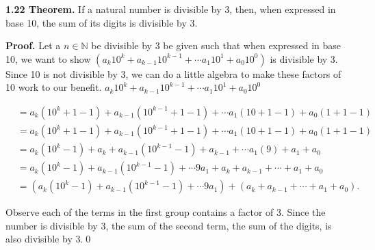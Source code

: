 \documentclass[12pt]{article}
\begin{document}
\noindent\textbf{1.22 Theorem.} If a natural number is divisible by 3, then, when expressed in base 10, the sum of its digits is divisible by 3.

\bigskip

\noindent\textbf{Proof.} Let a $n\in\mathbb{N}$ be divisible by 3 be given such that when expressed in base 10, we want to show $( a_k10^k + a_{k-1}10^{k-1} + \cdots a_1 10^1 + a_0 10^0 )$ is divisible by 3. Since 10 is not divisible by 3, we can do a little algebra to make these factors of 10 work to our benefit. $a_k10^k + a_{k-1}10^{k-1} + \cdots a_1 10^1 + a_0 10^0$

\begin{align*}
&= a_k(10^k +1 -1) + a_{k-1}(10^{k-1} +1 -1) + \cdots a_1(10+1-1) + a_0(1+1-1) \\
&= a_k(10^k +1 -1) + a_{k-1}(10^{k-1} +1 -1) + \cdots a_1(10+1-1) + a_0(1+1-1) \\
&= a_k(10^k -1)+ a_k + a_{k-1}(10^{k-1}-1)+a_{k-1} + \cdots a_1(9)+a_1 + a_0 \\
&= a_k(10^k -1) + a_{k-1}(10^{k-1}-1)+ \cdots 9a_1 +a_k +a_{k-1}+ \cdots +a_1 + a_0 \\
&= ( a_k(10^k -1) + a_{k-1}(10^{k-1}-1)+ \cdots 9a_1 ) + ( a_k +a_{k-1}+ \cdots +a_1 + a_0 ).
\end{align*}

\noindent Observe each of the terms in the first group contains a factor of 3. Since the number is divisible by 3, the sum of the second term, the sum of the digits, is also divisible by 3.\qed
\end{document}
